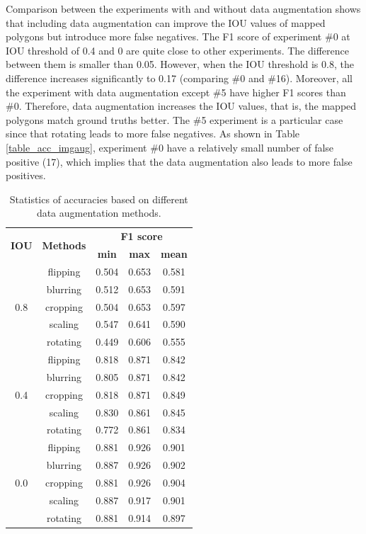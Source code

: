 \documentclass[preprint,12pt,authoryear]{elsarticle}
\begin{document}
Comparison between the experiments with and without data augmentation shows that including data augmentation can improve the IOU values of mapped polygons but introduce more false negatives. The F1 score of experiment \#0 at IOU threshold of 0.4 and 0 are quite close to other experiments. The difference between them is smaller than 0.05. However, when the IOU threshold is 0.8, the difference increases significantly to 0.17 (comparing \#0 and \#16). Moreover, all the experiment with data augmentation except \#5 have higher F1 scores than \#0. Therefore, data augmentation increases the IOU values, that is, the mapped polygons match ground truths better. The \#5 experiment is a particular case since that rotating leads to more false negatives. As shown in Table \ref{table_acc_imgaug}, experiment \#0 have a relatively small number of false positive (17), which implies that the data augmentation also leads to more false positives. 

\begin{table}[ht]
\centering
\footnotesize
\caption{Statistics of accuracies based on different data augmentation methods.}
\label{table_stastic_imgaug}
\begin{tabular}{c c c c  c  }
\toprule
\multirow{2}{*}{\textbf{IOU}}&\multirow{2}{*}{\textbf{Methods}}& \multicolumn{3}{c}{ \textbf{F1 score}} \\
 & &\textbf{min}&\textbf{max}&\textbf{mean}\\
\midrule
\multirow{5}{*}{0.8} &   flipping & 0.504 & 0.653 & 0.581 \\
  & blurring & 0.512 & 0.653 & 0.591\\
 & cropping & 0.504 & 0.653 & 0.597\\
 & scaling & 0.547 & 0.641 & 0.590\\
& rotating & 0.449 & 0.606 & 0.555 \\

\midrule
\multirow{5}{*}{0.4} &  flipping & 0.818 & 0.871 & 0.842 \\
 &  blurring & 0.805 & 0.871 & 0.842\\
 & cropping & 0.818 & 0.871 & 0.849\\
 & scaling & 0.830 & 0.861 & 0.845\\
& rotating & 0.772 & 0.861 & 0.834\\

\midrule
\multirow{5}{*}{0.0} & flipping & 0.881 & 0.926 & 0.901 \\
  &blurring & 0.887 & 0.926 & 0.902\\
  &cropping & 0.881 & 0.926 & 0.904\\
 &scaling & 0.887 & 0.917 & 0.901\\
&rotating & 0.881 & 0.914 & 0.897\\

\bottomrule
\end{tabular}
\end{table}
\end{document}
